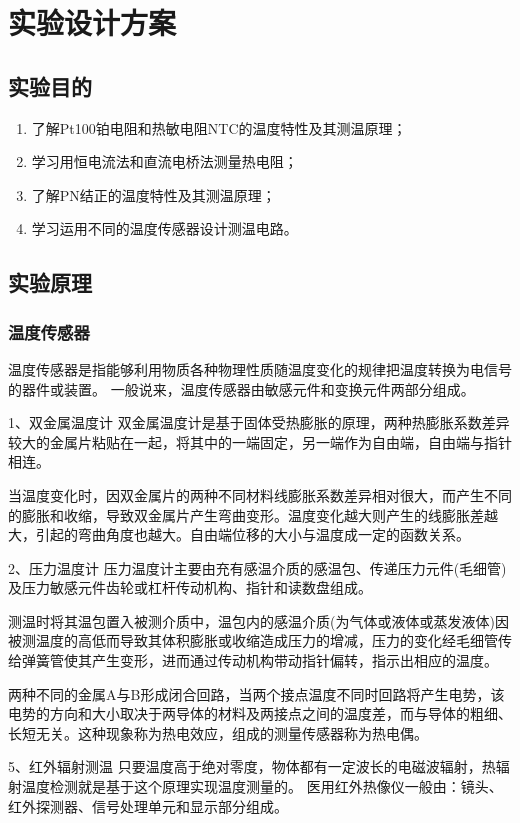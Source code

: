 \documentclass[a4paper]{../phyreport}
\begin{document}
\phyExpCover

\section{实验设计方案}  
\subsection{实验目的}
\begin{enumerate}
  \item 了解Pt100铂电阻和热敏电阻NTC的温度特性及其测温原理；
  \item 学习用恒电流法和直流电桥法测量热电阻；
  \item 了解PN结正的温度特性及其测温原理；  
  \item 学习运用不同的温度传感器设计测温电路。
\end{enumerate}
\subsection{实验原理}
\subsubsection{温度传感器}

温度传感器是指能够利用物质各种物理性质随温度变化的规律把温度转换为电信号的器件或装置。
一般说来，温度传感器由敏感元件和变换元件两部分组成。

1、双金属温度计
双金属温度计是基于固体受热膨胀的原理，两种热膨胀系数差异较大的金属片粘贴在一起，将其中的一端固定，另一端作为自由端，自由端与指针相连。  

当温度变化时，因双金属片的两种不同材料线膨胀系数差异相对很大，而产生不同的膨胀和收缩，导致双金属片产生弯曲变形。温度变化越大则产生的线膨胀差越大，引起的弯曲角度也越大。自由端位移的大小与温度成一定的函数关系。

2、压力温度计
压力温度计主要由充有感温介质的感温包、传递压力元件(毛细管)及压力敏感元件齿轮或杠杆传动机构、指针和读数盘组成。

测温时将其温包置入被测介质中，温包内的感温介质(为气体或液体或蒸发液体)因被测温度的高低而导致其体积膨胀或收缩造成压力的增减，压力的变化经毛细管传给弹簧管使其产生变形，进而通过传动机构带动指针偏转，指示出相应的温度。

两种不同的金属A与B形成闭合回路，当两个接点温度不同时回路将产生电势，该电势的方向和大小取决于两导体的材料及两接点之间的温度差，而与导体的粗细、长短无关。这种现象称为热电效应，组成的测量传感器称为热电偶。

5、红外辐射测温
只要温度高于绝对零度，物体都有一定波长的电磁波辐射，热辐射温度检测就是基于这个原理实现温度测量的。
医用红外热像仪一般由：镜头、红外探测器、信号处理单元和显示部分组成。
\end{document}
